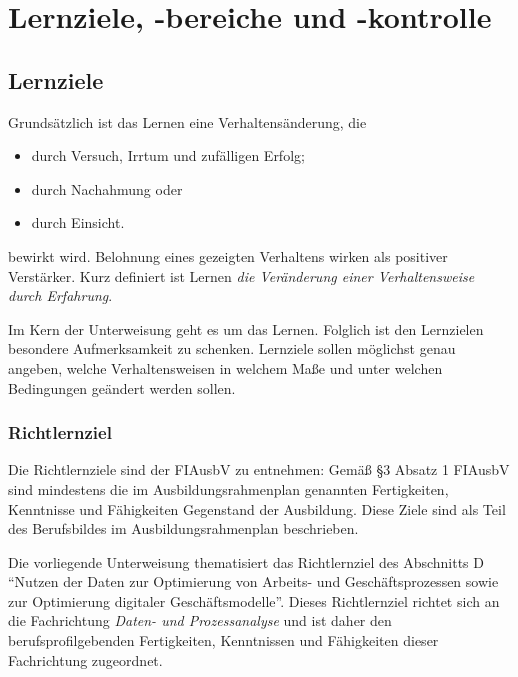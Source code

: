 \chapter{Lernziele, -bereiche und -kontrolle}

\section{Lernziele}
Grundsätzlich ist das Lernen eine Verhaltensänderung, die 

\begin{itemize}
	\item durch Versuch, Irrtum und zufälligen Erfolg;
	\item durch Nachahmung oder 
	\item durch Einsicht.
\end{itemize}

bewirkt wird. Belohnung eines gezeigten Verhaltens wirken als positiver Verstärker. Kurz definiert ist Lernen \textit{die Veränderung einer Verhaltensweise durch Erfahrung}.
\par
Im Kern der Unterweisung geht es um das Lernen. Folglich ist den Lernzielen besondere Aufmerksamkeit zu schenken. Lernziele sollen möglichst genau angeben, welche Verhaltensweisen in welchem Maße und unter welchen Bedingungen geändert werden sollen. 

\subsection{Richtlernziel}
Die Richtlernziele sind der \ac{FIAusbV} zu entnehmen: Gemäß §3 Absatz 1 FIAusbV\autocite[][§3 I FIAusbV]{bundesminister_fur_wirtschaft_und_energie_verordnung_2020} sind mindestens die im Ausbildungsrahmenplan genannten Fertigkeiten, Kenntnisse und Fähigkeiten Gegenstand der Ausbildung. Diese Ziele sind als Teil des Berufsbildes im Ausbildungsrahmenplan beschrieben. 
\par
Die vorliegende Unterweisung thematisiert das Richtlernziel des Abschnitts D \enquote{Nutzen der Daten zur Optimierung von Arbeits- und Geschäftsprozessen sowie zur Optimierung digitaler Geschäftsmodelle}\autocite[vgl.][§4 V Nr.\,3 FIAusbV]{bundesminister_fur_wirtschaft_und_energie_verordnung_2020}. Dieses Richtlernziel richtet sich an die Fachrichtung \textit{Daten- und Prozessanalyse} und ist daher den berufsprofilgebenden Fertigkeiten, Kenntnissen und Fähigkeiten dieser Fachrichtung zugeordnet.

